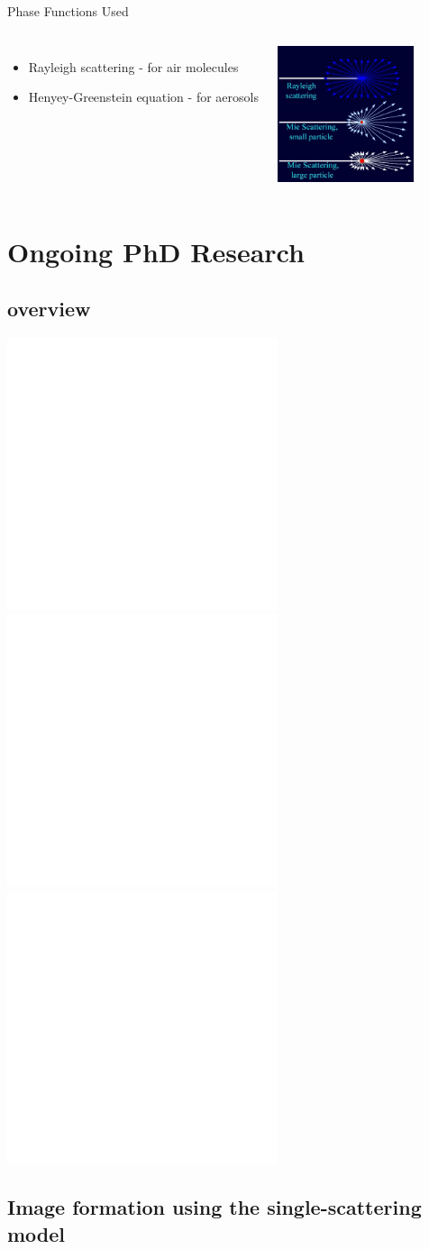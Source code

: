\documentclass[compress,red,12pt]{beamer}
\begin{document}
\begin{frame}[T]{Phase Functions Used}
  \begin{columns}[T]
    \begin{itemize}
    \item Rayleigh scattering - for air molecules
    \item Henyey-Greenstein equation - for aerosols
    \end{itemize}
    \centering
    \includegraphics[height=4cm]{images/Mie_Rayleigh.jpg}
  \end{columns}
\end{frame}


\section{Ongoing PhD Research}


\subsection{overview}

\begin{frame}{}
  \begin{center}
    \includegraphics<1>[height=8cm]{images/diagram.pdf}    
    \includegraphics<2>[height=8cm]{images/diagram_reference_images.pdf}    
    \includegraphics<3>[height=8cm]{images/diagram_models.pdf}    
  \end{center}
\end{frame}


\subsection{Image formation using the single-scattering model}
\end{document}
